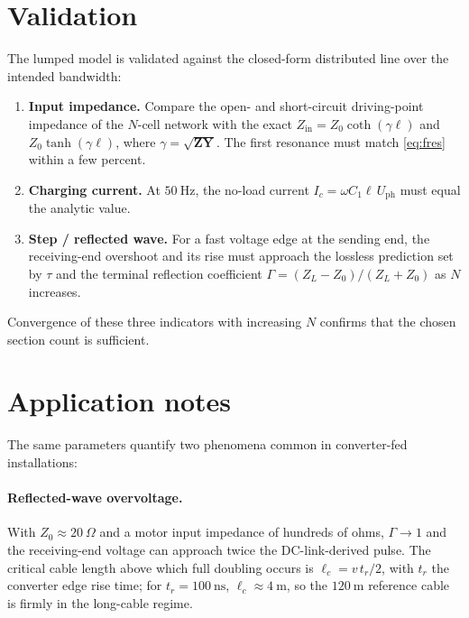 \documentclass[11pt,a4paper]{article}
\newcommand{\Zmat}{\bm{Z}}
\newcommand{\Ymat}{\bm{Y}}
\begin{document}
\section{Validation}
The lumped model is validated against the closed-form distributed line over the
intended bandwidth:
\begin{enumerate}[leftmargin=*]
\item \textbf{Input impedance.} Compare the open- and short-circuit driving-point
impedance of the $N$-cell network with the exact
$Z_{\mathrm{in}}=Z_0\coth(\gamma\ell)$ and $Z_0\tanh(\gamma\ell)$, where
$\gamma=\sqrt{\Zmat\Ymat}$. The first resonance must match \eqref{eq:fres} within a
few percent.
\item \textbf{Charging current.} At $50\ \mathrm{Hz}$, the no-load current
$I_c=\omega C_1 \ell\, U_{\mathrm{ph}}$ must equal the analytic value.
\item \textbf{Step / reflected wave.} For a fast voltage edge at the sending end,
the receiving-end overshoot and its rise must approach the lossless prediction set
by $\tau$ and the terminal reflection coefficient
$\Gamma=(Z_L-Z_0)/(Z_L+Z_0)$ as $N$ increases.
\end{enumerate}
Convergence of these three indicators with increasing $N$ confirms that the chosen
section count is sufficient.

\section{Application notes}
The same parameters quantify two phenomena common in converter-fed installations:

\paragraph{Reflected-wave overvoltage.} With $Z_0\approx20\ \Omega$ and a motor
input impedance of hundreds of ohms, $\Gamma\to1$ and the receiving-end voltage can
approach twice the DC-link-derived pulse. The critical cable length above which
full doubling occurs is $\ell_c=v\,t_r/2$, with $t_r$ the converter edge rise
time; for $t_r=100\ \mathrm{ns}$, $\ell_c\approx4\ \mathrm{m}$, so the
$120\ \mathrm{m}$ reference cable is firmly in the long-cable regime.
\end{document}
